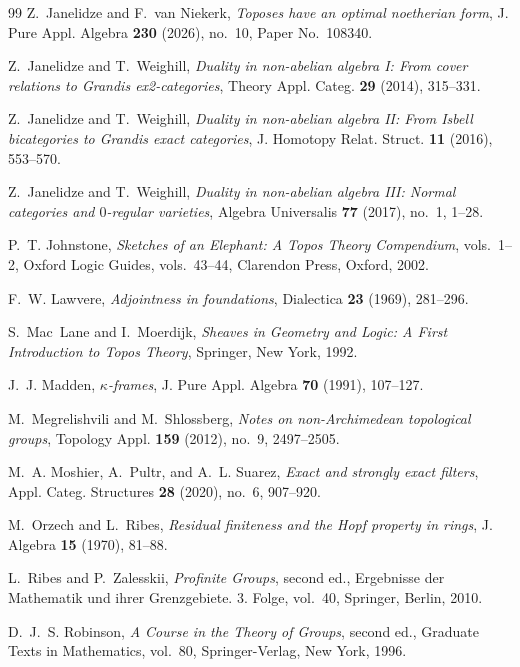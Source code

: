 \documentclass[12pt,oneside,reqno]{amsart}
\theoremstyle{definition}
\theoremstyle{remark}
\begin{document}
\begin{thebibliography}{99}
Z.~Janelidze and F.~van Niekerk,
\emph{Toposes have an optimal noetherian form},
J. Pure Appl. Algebra \textbf{230} (2026), no.~10, Paper No.~108340.

Z.~Janelidze and T.~Weighill,
\emph{Duality in non-abelian algebra I: From cover relations to Grandis
ex2-categories},
Theory Appl. Categ. \textbf{29} (2014), 315--331.

Z.~Janelidze and T.~Weighill,
\emph{Duality in non-abelian algebra II: From Isbell bicategories to
Grandis exact categories},
J. Homotopy Relat. Struct. \textbf{11} (2016), 553--570.

Z.~Janelidze and T.~Weighill,
\emph{Duality in non-abelian algebra III: Normal categories and
\(0\)-regular varieties},
Algebra Universalis \textbf{77} (2017), no.~1, 1--28.

P.~T. Johnstone,
\emph{Sketches of an Elephant: A Topos Theory Compendium}, vols.~1--2,
Oxford Logic Guides, vols.~43--44, Clarendon Press, Oxford, 2002.

F.~W. Lawvere,
\emph{Adjointness in foundations},
Dialectica \textbf{23} (1969), 281--296.

S.~Mac~Lane and I.~Moerdijk,
\emph{Sheaves in Geometry and Logic: A First Introduction to Topos
Theory}, Springer, New York, 1992.

J.~J. Madden,
\emph{\(\kappa\)-frames},
J. Pure Appl. Algebra \textbf{70} (1991), 107--127.

M.~Megrelishvili and M.~Shlossberg,
\emph{Notes on non-Archimedean topological groups},
Topology Appl. \textbf{159} (2012), no.~9, 2497--2505.

M.~A. Moshier, A.~Pultr, and A.~L. Suarez,
\emph{Exact and strongly exact filters},
Appl. Categ. Structures \textbf{28} (2020), no.~6, 907--920.

M.~Orzech and L.~Ribes,
\emph{Residual finiteness and the Hopf property in rings},
J. Algebra \textbf{15} (1970), 81--88.

L.~Ribes and P.~Zalesskii,
\emph{Profinite Groups}, second ed., Ergebnisse der Mathematik und
ihrer Grenzgebiete. 3. Folge, vol.~40, Springer, Berlin, 2010.

D.~J.~S. Robinson,
\emph{A Course in the Theory of Groups}, second ed., Graduate Texts in
Mathematics, vol.~80, Springer-Verlag, New York, 1996.


\end{thebibliography}
\end{document}
